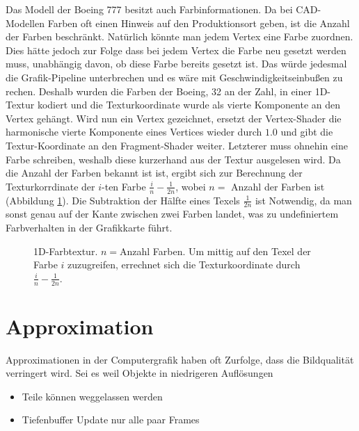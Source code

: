 Das Modell der Boeing 777 besitzt auch Farbinformationen. Da bei CAD-Modellen Farben oft einen Hinweis auf den Produktionsort geben, ist die Anzahl der Farben beschränkt. Natürlich könnte man jedem Vertex eine Farbe zuordnen. Dies hätte jedoch zur Folge dass bei jedem Vertex die Farbe neu gesetzt werden muss, unabhängig davon, ob diese Farbe bereits gesetzt ist. Das würde jedesmal die Grafik-Pipeline unterbrechen und es wäre mit Geschwindigkeitseinbußen zu rechen. Deshalb wurden die Farben der Boeing, 32 an der Zahl, in einer 1D-Textur kodiert und die Texturkoordinate wurde als vierte Komponente an den Vertex gehängt. Wird nun ein Vertex gezeichnet, ersetzt der Vertex-Shader die harmonische vierte Komponente eines Vertices wieder durch $1.0$ und gibt die Textur-Koordinate an den Fragment-Shader weiter. Letzterer muss ohnehin eine Farbe schreiben, weshalb diese kurzerhand aus der Textur ausgelesen wird. Da die Anzahl der Farben bekannt ist ist, ergibt sich zur Berechnung der Texturkorrdinate der $i$-ten Farbe $\frac{i}{n}-\frac{1}{2n}$, wobei $n=$  Anzahl der Farben ist (Abbildung \ref{fig:basics:1dtexture}). Die Subtraktion der Hälfte eines Texels $\frac{1}{2n}$ ist Notwendig, da man sonst genau auf der Kante zwischen zwei Farben landet, was zu undefiniertem Farbverhalten in der Grafikkarte führt.
\begin{figure}
  \centering
  
  \caption{1D-Farbtextur. $n=$Anzahl Farben. Um mittig auf den Texel der Farbe $i$ zuzugreifen, errechnet sich die Texturkoordinate durch $\frac{i}{n}-\frac{1}{2n}$. }
  \label{fig:basics:1dtexture}
\end{figure}

\section{Approximation}
\label{sec:basics:approximation}
Approximationen in der Computergrafik haben oft  Zurfolge, dass die Bildqualität verringert wird. Sei es weil Objekte in niedrigeren Auflösungen
\begin{itemize}
 \item Teile können weggelassen werden
 \item Tiefenbuffer Update nur alle paar Frames
\end{itemize}

